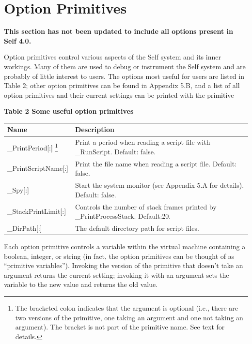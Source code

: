 \documentclass[letterpaper,10pt,english]{sphinxmanual}
\begin{document}

\section{Option Primitives}
\label{vmref:index-43}\label{vmref:option-primitives}
\textbf{This section has not been updated to include all options present in Self 4.0.}

Option primitives control various aspects of the Self system and its inner workings. Many of
them are used to debug or instrument the Self system and are probably of little interest to users.
The options most useful for users are listed in Table 2; other option primitives can be found in Appendix
5.B, and a list of all option primitives and their current settings can be printed with the
primitive 

\textbf{Table 2 Some useful option primitives}

\begin{tabulary}{\linewidth}{p{5cm} p{10cm}}
\hline
\textbf{
Name
} & \textbf{
Description
}\\\hline

\_PrintPeriod{[}:{]} \footnote{
The bracketed colon indicates that the argument is optional (i.e., there are two versions of the primitive, one taking an argument and one not taking an argument). The bracket is not part of the primitive name. See text for details.
}
 & 
Print a period when reading a script file with \_RunScript. Default: false.
\\\hline

\_PrintScriptName{[}:{]}
 & 
Print the file name when reading a script file. Default: false.
\\\hline

\_Spy{[}:{]}
 & 
Start the system monitor (see Appendix 5.A for details). Default: false.
\\\hline

\_StackPrintLimit{[}:{]}
 & 
Controls the number of stack frames printed by \_PrintProcessStack. Default:20.
\\\hline

\_DirPath{[}:{]}
 & 
The default directory path for script files.
\\\hline
\end{tabulary}


Each option primitive controls a variable within the virtual machine containing a boolean, integer,
or string (in fact, the option primitives can be thought of as “primitive variables”). Invoking the
version of the primitive that doesn’t take an argument returns the current setting; invoking it with
an argument sets the variable to the new value and returns the old value.
\end{document}
